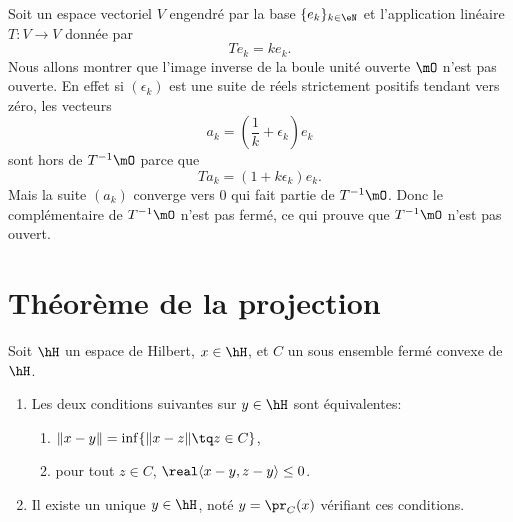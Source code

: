 \begin{example}
    Soit un espace vectoriel \( V\) engendré par la base \( \{ e_k \}_{k\in \eN}\) et l'application linéaire \( T\colon V\to V\) donnée par
    \begin{equation}
        Te_k=ke_k.
    \end{equation}
    Nous allons montrer que l'image inverse de la boule unité ouverte \( \mO\) n'est pas ouverte. En effet si \( (\epsilon_k)\) est une suite de réels strictement positifs tendant vers zéro, les vecteurs
    \begin{equation}
        a_k=\left( \frac{1}{ k }+\epsilon_k \right)e_k
    \end{equation}
    sont hors de \( T^{-1}\mO\) parce que
    \begin{equation}
        Ta_k=(1+k\epsilon_k)e_k.
    \end{equation}
    Mais la suite \( (a_k)\) converge vers \( 0\) qui fait partie de \( T^{-1}\mO\). Donc le complémentaire de \( T^{-1}\mO\) n'est pas fermé, ce qui prouve que \( T^{-1}\mO\) n'est pas ouvert.
\end{example}

\section{Théorème de la projection}

\begin{theorem} \label{ThoProjOrthuzcYkz}
    Soit \( \hH\) un espace de Hilbert, \( x\in \hH\), et \( C\) un sous ensemble fermé convexe de \( \hH\).
    \begin{enumerate}
        \item
            Les deux conditions suivantes sur \( y\in \hH\) sont équivalentes:
    \begin{enumerate}
        \item   \label{ETsfYCSItemi}
            \( \| x-y \|=\inf\{ \| x-z \|\tq z\in C \}\),
        \item\label{ETsfYCSItemii}
            pour tout \( z\in C\), \( \real\langle x-y, z-y\rangle \leq 0\).
    \end{enumerate}
\item
    Il existe un unique \( y\in \hH\), noté \( y=\pr_C(x)\) vérifiant ces conditions.
    \end{enumerate}
\end{theorem}

